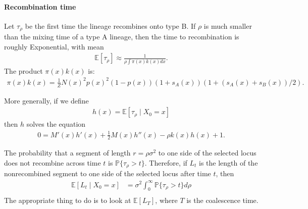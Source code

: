 \documentclass{article}
\newcommand{\E}{\mathbb{E}}
\renewcommand{\P}{\mathbb{P}}
\newcommand{\given}{\;\vert\;}
\begin{document}
\paragraph{Recombination time}
Let $\tau_\rho$ be the first time  the lineage recombines onto type B.
If $\rho$ is much smaller than the mixing time of a type A lineage,
then the time to recombination is roughly Exponential,
with mean
\begin{align}
    \E[\tau_\rho] \approx \frac{1}{ \rho \int \pi(x) k(x) dx } .
\end{align}
The product $\pi(x) k(x)$ is:
\begin{align}
    \pi(x) k(x) = \frac{1}{Z} N(x)^2 p(x)^2 (1-p(x)) (1+s_A(x)) (1+(s_A(x)+s_B(x))/2) .
\end{align}

More generally, if we define
\begin{align}
    h(x) = \E[\tau_\rho \given X_0 = x]
\end{align}
then $h$ solves the equation
\begin{align}
    0 = M'(x) h'(x) + \frac{1}{2} M(x) h''(x) - \rho k(x) h(x) + 1 .
\end{align}

The probability that a segment of length $r = \rho \sigma^2$ to one side of the selected locus
does not recombine across time $t$ is $\P\{\tau_\rho > t\}$.
Therefore, if $L_t$ is the length of the nonrecombined segment to one side of the selected locus
after time $t$, then
\begin{align}
    \E[ L_t \given X_0=x ] &= \sigma^2 \int_0^\infty \P\{ \tau_\rho > t \} d\rho \\
\end{align}
The appropriate thing to do is to look at $\E[L_T]$, where $T$ is the coalescence time.
\end{document}
